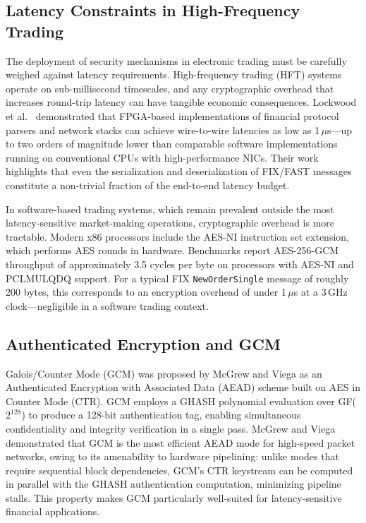 \documentclass[twocolumn,10pt]{article}
\begin{document}
\subsection{Latency Constraints in High-Frequency Trading}

The deployment of security mechanisms in electronic trading must be carefully
weighed against latency requirements. High-frequency trading (HFT) systems
operate on sub-millisecond timescales, and any cryptographic overhead that
increases round-trip latency can have tangible economic consequences.
Lockwood et al.\ \cite{lockwood2012hft} demonstrated that FPGA-based
implementations of financial protocol parsers and network stacks can achieve
wire-to-wire latencies as low as 1\,$\mu$s—up to two orders of magnitude
lower than comparable software implementations running on conventional CPUs
with high-performance NICs. Their work highlights that even the serialization
and deserialization of FIX/FAST messages constitute a non-trivial fraction of
the end-to-end latency budget.

In software-based trading systems, which remain prevalent outside the most
latency-sensitive market-making operations, cryptographic overhead is more
tractable. Modern x86 processors include the AES-NI instruction set
extension, which performs AES rounds in hardware. Benchmarks report
AES-256-GCM throughput of approximately 3.5 cycles per byte on processors
with AES-NI and PCLMULQDQ support. For a typical FIX \texttt{NewOrderSingle}
message of roughly 200 bytes, this corresponds to an encryption overhead of
under 1\,$\mu$s at a 3\,GHz clock—negligible in a software trading context.

\subsection{Authenticated Encryption and GCM}

Galois/Counter Mode (GCM) was proposed by McGrew and Viega \cite{mcgrew2004gcm}
as an Authenticated Encryption with Associated Data (AEAD) scheme built on
AES in Counter Mode (CTR). GCM employs a GHASH polynomial evaluation over
GF($2^{128}$) to produce a 128-bit authentication tag, enabling simultaneous
confidentiality and integrity verification in a single pass. McGrew and Viega
demonstrated that GCM is the most efficient AEAD mode for high-speed packet
networks, owing to its amenability to hardware pipelining: unlike modes that
require sequential block dependencies, GCM's CTR keystream can be computed
in parallel with the GHASH authentication computation, minimizing pipeline
stalls. This property makes GCM particularly well-suited for latency-sensitive
financial applications.
\end{document}
